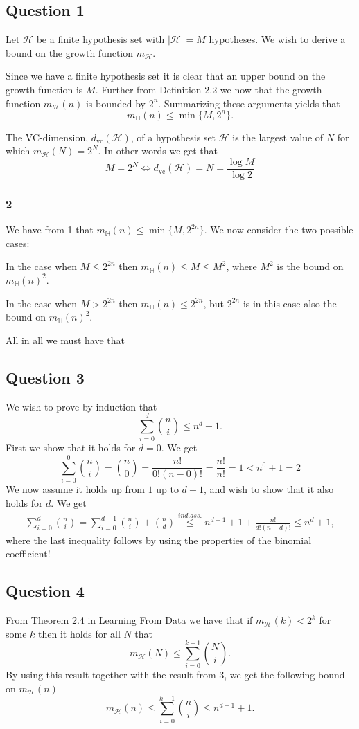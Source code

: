 \subsection{Question 1}
Let $\mathcal{H}$ be a finite hypothesis set with $|\mathcal{H}|=M$ hypotheses. We wish to derive a bound on the growth function $m_{\mathcal{H}}$. 
 
Since we have a finite hypothesis set it is clear that an upper bound on the growth function is $M$. Further from Definition 2.2 we now that the growth function $m_{\mathcal{H}}(n)$ is bounded by $2^n$. Summarizing these arguments yields that 
\[ m_{\mathbb{H}}(n) \leq \min \lbrace M, 2^n \rbrace. \]   

The VC-dimension, $d_{\text{vc}}(\mathcal{H})$, of a hypothesis set $\mathcal{H}$ is the largest value of $N$ for which $m_{\mathcal{H}}(N)=2^N$. In other words we get that 
\[ M=2^N \Leftrightarrow d_{\text{vc}}(\mathcal{H})=N=\frac{\log M}{\log 2} \] 
\subsubsection*{2}
We have from 1 that $m_{\mathbb{H}}(n) \leq \min \lbrace M, 2^{2n} \rbrace$. We now consider the two possible cases: 

In the case when $M \leq 2^{2n}$ then $m_{\mathbb{H}}(n) \leq M \leq M^2$, where $M^2$ is the bound on $m_{\mathbb{H}}(n)^2$.  

In the case when $M > 2^{2n}$ then $m_{\mathbb{H}}(n) \leq 2^{2n}$, but $2^{2n}$ is in this case also the bound on $m_{\mathbb{H}}(n)^2$. 

All in all we must have that 

\subsection{Question 3}
We wish to prove by induction that 
\[ \sum_{i=0}^d \binom{n}{i} \leq n^d+1. \] 
First we show that it holds for $d=0$. We get 
\[ \sum_{i=0}^0 \binom{n}{i}=\binom{n}{0}=\frac{n!}{0!(n-0)!}=\frac{n!}{n!}=1 < n^0+1=2 \]
We now assume it holds up from $1$ up to $d-1$, and wish to show that it also holds for $d$. We get 
\begin{align*}
\sum_{i=0}^d \binom{n}{i} = \sum_{i=0}^{d-1} \binom{n}{i} + \binom{n}{d}  \stackrel{ind. ass.}{\leq} n^{d-1}+1+\frac{n!}{d!(n-d)!} \leq n^d+1,
\end{align*}
where the last inequality follows by using the properties of the binomial coefficient!
\subsection{Question 4}
From Theorem 2.4 in Learning From Data we have that if $m_{\mathcal{H}}(k) < 2^k$ for some $k$ then it holds for all $N$ that 
\[m_{\mathcal{H}}(N) \leq \sum_{i=0}^{k-1} \binom{N}{i}. \]
By using this result together with the result from 3, we get the following bound on $m_{\mathcal{H}}(n)$
\[m_{\mathcal{H}}(n) \leq \sum_{i=0}^{k-1} \binom{n}{i} \leq n^{d-1}+1. \] 
